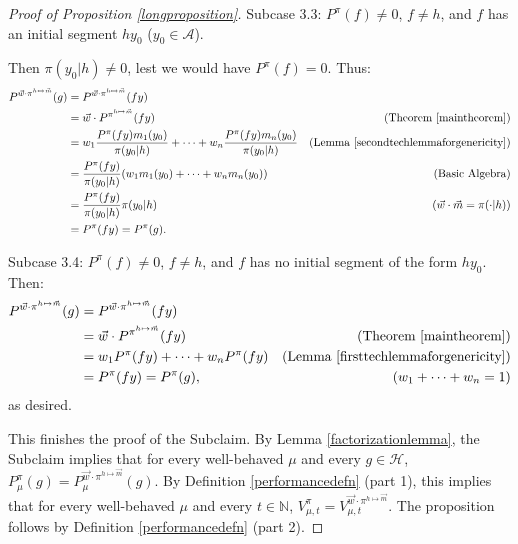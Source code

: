 \documentclass[twoside]{article}
\begin{document}
\begin{proof}[Proof of Proposition \ref{longproposition}]
    Subcase 3.3: $P^\pi(f)\not=0$, $f\not=h$, and
    $f$ has an initial segment $h y_0$ ($y_0\in\mathcal A$).

    Then $\pi(y_0|h)\not=0$, lest
    we would have $P^\pi(f)=0$. Thus:
    \begin{align*}
        P^{\vec w\cdot\pi^{h\mapsto \vec m}}(g)
            &= P^{\vec w\cdot \pi^{h\mapsto \vec m}}(fy)\\
            &= \vec w\cdot{P^{\pi^{h\mapsto \vec m}}}(fy)
                    &\mbox{(Theorem \ref{maintheorem})}\\
            &= w_1\frac{P^\pi(fy)m_1(y_0)}{\pi(y_0|h)}
                +\cdots+w_n\frac{P^\pi(fy)m_n(y_0)}{\pi(y_0|h)}
                    &\mbox{(Lemma \ref{secondtechlemmaforgenericity})}\\
            &= \frac{P^\pi(fy)}{\pi(y_0|h)}(w_1m_1(y_0)+\cdots+w_nm_n(y_0))
                    &\mbox{(Basic Algebra)}\\
            &= \frac{P^\pi(fy)}{\pi(y_0|h)}\pi(y_0|h)
                    &\mbox{($\vec w\cdot\vec m=\pi(\cdot|h)$)}\\
            &= P^\pi(fy) = P^\pi(g).
    \end{align*}

    Subcase 3.4: $P^\pi(f)\not=0$, $f\not=h$, and $f$ has no initial segment
        of the form $hy_0$. Then:
    \begin{align*}
        P^{\vec w\cdot\pi^{h\mapsto \vec m}}(g)
            &= P^{\vec w\cdot\pi^{h\mapsto \vec m}}(fy)\\
            &= \vec w\cdot{P^{\pi^{h\mapsto \vec m}}}(fy)
                    &\mbox{(Theorem \ref{maintheorem})}\\
            &= w_1P^\pi(fy)+\cdots+w_nP^\pi(fy)
                    &\mbox{(Lemma \ref{firsttechlemmaforgenericity})}\\
            &= P^\pi(fy) = P^\pi(g),
                    &\mbox{($w_1+\cdots+w_n=1$)}
    \end{align*}
    as desired.

    This finishes the proof of the Subclaim.
    By Lemma \ref{factorizationlemma}, the Subclaim implies
    that for every well-behaved $\mu$ and every $g\in\mathcal H$,
    $
    P^\pi_\mu(g)
    =
    P^{\vec w\cdot\pi^{h\mapsto \vec m}}_\mu(g)
    $.
    By Definition \ref{performancedefn} (part 1), this implies that
    for every well-behaved $\mu$ and every $t\in\mathbb N$,
    $
        V^{\pi}_{\mu,t}
        =
        V^{\vec w\cdot \pi^{h\mapsto \vec m}}_{\mu,t}.
    $
    The proposition follows by Definition \ref{performancedefn} (part 2).
\end{proof}
\end{document}
